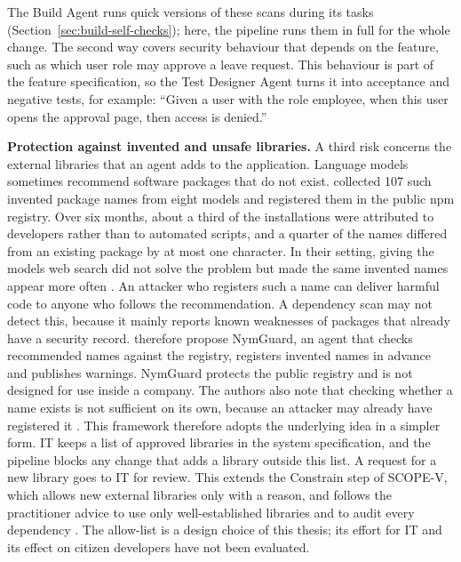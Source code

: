 \documentclass[10pt,a4paper]{article}
\begin{document}
The Build Agent runs quick versions of these
scans during its tasks (Section~\ref{sec:build-self-checks}); here, the
pipeline runs them in full for the whole change. The second way covers
security behaviour that depends on the feature, such as which user role may
approve a leave request. This behaviour is part of the feature specification,
so the Test Designer Agent turns it into acceptance and negative tests, for
example: \enquote{Given a user with the role employee, when this user opens
the approval page, then access is denied.}


\textbf{Protection against invented and unsafe libraries.} A third risk
concerns the external libraries that an agent adds to the application.
Language models sometimes recommend software packages that do not exist.
\textcite{TODO-huang2026package} collected 107 such invented package names
from eight models and registered them in the public npm registry. Over six
months, about a third of the installations were attributed to developers
rather than to automated scripts, and a quarter of the names differed from
an existing package by at most one character. In their setting, giving the
models web search did not solve the problem but made the same invented
names appear more often \parencite{TODO-huang2026package}. An attacker who
registers such a name can deliver harmful code to anyone who follows the
recommendation. A dependency scan may not detect this, because it mainly
reports known weaknesses of packages that already have a security record.
\textcite{TODO-huang2026package} therefore propose NymGuard, an agent that
checks recommended names against the registry, registers invented names
in advance and publishes warnings. NymGuard protects the public registry
and is not designed for use inside a company. The authors also note that
checking whether a name exists is not sufficient on its own, because an
attacker may already have registered it \parencite{TODO-huang2026package}.
This framework therefore adopts the underlying idea in a simpler form. IT
keeps a list of approved libraries in the system specification, and the
pipeline blocks any change that adds a library outside this list. A
request for a new library goes to IT for review. This extends the
Constrain step of SCOPE-V, which allows new external libraries only with a
reason, and follows the practitioner advice to use only well-established
libraries and to audit every dependency \parencite{TODO-koul2026vibesec}.
The allow-list is a design choice of this thesis; its effort for IT and
its effect on citizen developers have not been evaluated.
 
\end{document}
